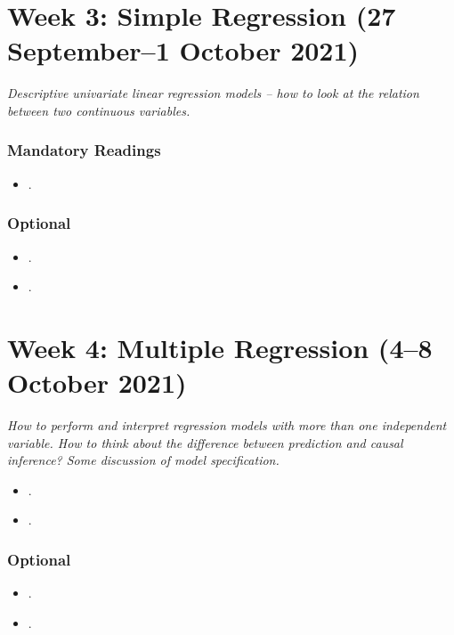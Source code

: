 \documentclass[abstract=on,parskip=full,headings=standardclasses,fontsize=11pt,paper=a4]{scrartcl}
\begin{document}
\section{Week 3: Simple Regression (27 September--1 October 2021)}

\textit{Descriptive univariate linear regression models -- how to look at the relation between two continuous variables.}


\subsubsection*{Mandatory Readings}

\begin{itemize}
\item {}.
\end{itemize}


\subsubsection*{Optional}
\begin{itemize}
\item {}.
\item {}.
\end{itemize}


\section{Week 4:  Multiple Regression (4--8 October 2021)}

\textit{How to perform and interpret regression models with more than one independent variable. How to think about the difference between prediction and causal inference? Some discussion of model specification.}


\begin{itemize}
\item {}.
\item {}.
\end{itemize}

\subsubsection*{Optional}
\begin{itemize}
\item {}.
\item {}.
\end{itemize}
\end{document}
